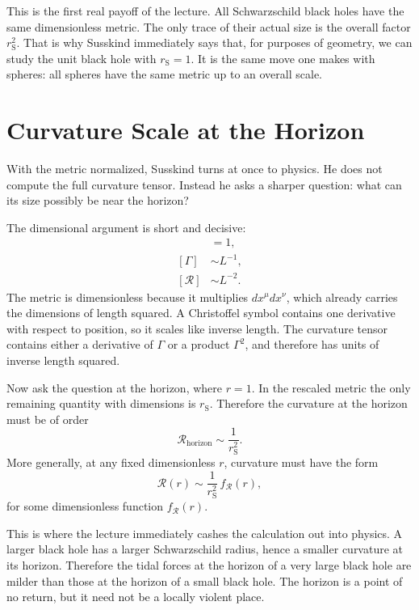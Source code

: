This is the first real payoff of the lecture. All Schwarzschild black holes have the same dimensionless metric. The only trace of their actual size is the overall factor \(r_{\mathrm S}^2\). That is why Susskind immediately says that, for purposes of geometry, we can study the unit black hole with \(r_{\mathrm S}=1\). It is the same move one makes with spheres: all spheres have the same metric up to an overall scale.

\section{Curvature Scale at the Horizon}

With the metric normalized, Susskind turns at once to physics. He does not compute the full curvature tensor. Instead he asks a sharper question: what can its size possibly be near the horizon?

The dimensional argument is short and decisive:
\begin{align}
[g_{\mu\nu}] &= 1,\\
[\Gamma] &\sim L^{-1},\\
[\mathcal R] &\sim L^{-2}.
\end{align}
The metric is dimensionless because it multiplies \(dx^\mu dx^\nu\), which already carries the dimensions of length squared. A Christoffel symbol contains one derivative with respect to position, so it scales like inverse length. The curvature tensor contains either a derivative of \(\Gamma\) or a product \(\Gamma^2\), and therefore has units of inverse length squared.

Now ask the question at the horizon, where \(r=1\). In the rescaled metric the only remaining quantity with dimensions is \(r_{\mathrm S}\). Therefore the curvature at the horizon must be of order
\begin{equation}
\mathcal R_{\text{horizon}} \sim \frac{1}{r_{\mathrm S}^2}.
\end{equation}
More generally, at any fixed dimensionless \(r\), curvature must have the form
\begin{equation}
\mathcal R(r)\sim \frac{1}{r_{\mathrm S}^2}\,f_{\mathcal R}(r),
\end{equation}
for some dimensionless function \(f_{\mathcal R}(r)\).

This is where the lecture immediately cashes the calculation out into physics. A larger black hole has a larger Schwarzschild radius, hence a smaller curvature at its horizon. Therefore the tidal forces at the horizon of a very large black hole are milder than those at the horizon of a small black hole. The horizon is a point of no return, but it need not be a locally violent place.


